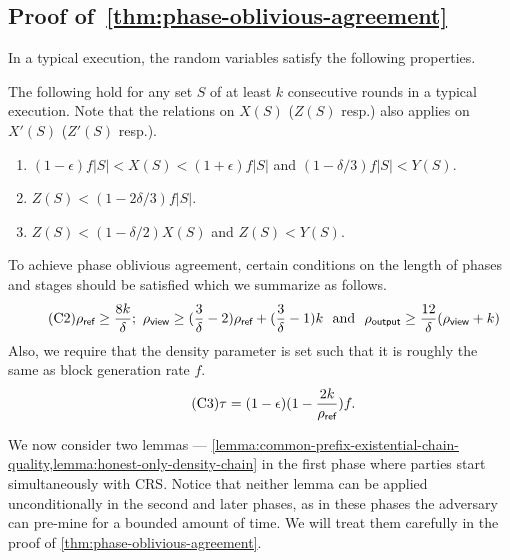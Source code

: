 \subsection{Proof of~\cref*{thm:phase-oblivious-agreement}}
\label{subsec:analysis-phase-oblivious-agreement}

In a typical execution, the random variables satisfy the following properties.

\begin{lemma}
    \label{lemma:random-variable-bounds}

    The following hold for any set $S$ of at least $k$ consecutive rounds in a typical execution.
    Note that the relations on $X(S)$ ($Z(S)$ resp.) also applies on $X'(S)$ ($Z'(S)$ resp.).
    \begin{enumerate}[label=(\alph*), leftmargin=*, nosep]
        \item $(1 - \epsilon) f |S| < X(S) < (1 + \epsilon) f |S|$ and $(1 - \delta / 3) f |S| < Y(S)$.
        \item $Z(S) < (1 - 2\delta / 3) f |S|$.
        \item $Z(S) < (1 - \delta / 2) X(S)$ and $Z(S) < Y(S)$.
    \end{enumerate}
\end{lemma}

To achieve phase oblivious agreement, certain conditions on the length of phases and stages should be satisfied which we summarize as follows.
%
\begin{equation} \tag{C2} \label{condition:phase-length}
    \rho_{\textsf{ref}} \ge \frac{8k}{\delta};~
    \rho_{\textsf{view}} \ge (\frac{3}{\delta} - 2)\rho_{\textsf{ref}} + (\frac{3}{\delta} - 1)k
    ~~\text{and}~~
    \rho_{\textsf{output}} \ge \frac{12}{\delta}(\rho_{\textsf{view}} + k)
\end{equation}
%
Also, we require that the density parameter \densityParam is set such that it is roughly the same as block generation rate $f$.
%
\begin{equation} \tag{C3} \label{condition:density-param}
    \tau = (1 - \epsilon) (1 - \frac{2k}{\rho_{\textsf{ref}}}) f.
\end{equation}

We now consider two lemmas --- \cref{lemma:common-prefix-existential-chain-quality,lemma:honest-only-density-chain} in the first phase where parties start simultaneously with CRS.
%
Notice that neither lemma can be applied unconditionally in the second and later phases, as in these phases the adversary can pre-mine for a bounded amount of time.
%
We will treat them carefully in the proof of \cref{thm:phase-oblivious-agreement}.

